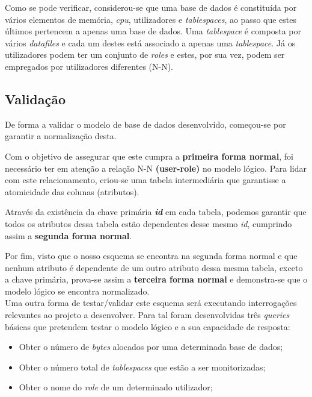 \documentclass[a4paper]{article}
\begin{document}
Como se pode verificar, considerou-se que uma base de dados é constituída por vários elementos de memória, \emph{cpu}, utilizadores e \emph{tablespaces}, ao passo que estes últimos pertencem a apenas uma base de dados. Uma \emph{tablespace} é composta por vários \emph{datafiles} e cada um destes está associado a apenas uma \emph{tablespace}. Já os utilizadores podem ter um conjunto de \emph{roles} e estes, por sua vez, podem ser empregados por utilizadores diferentes (N-N).


\subsection{Validação}
\hspace{3mm} 
De forma a validar o modelo de base de dados desenvolvido, começou-se por garantir a normalização desta. 

Com o objetivo de assegurar que este cumpra a \textbf{primeira forma normal}, foi necessário ter em atenção a relação N-N \textbf{(user-role)} no modelo lógico. Para lidar com este relacionamento, criou-se uma tabela intermediária que garantisse a atomicidade das colunas (atributos). 

Através da existência da chave primária \emph{\textbf{id}} em cada tabela, podemos garantir que todos os atributos dessa tabela estão dependentes desse mesmo \emph{id}, cumprindo assim a \textbf{segunda forma normal}. 

Por fim, visto que o nosso esquema se encontra na segunda forma normal e que nenhum atributo é dependente de um outro atributo dessa mesma tabela, exceto a chave primária, prova-se assim a \textbf{terceira forma normal} e demonstra-se que o modelo lógico se encontra normalizado.\\

Uma outra forma de testar/validar este esquema será executando interrogações relevantes ao projeto a desenvolver. Para tal foram desenvolvidas três \emph{queries} básicas que pretendem testar o modelo lógico e a sua capacidade de resposta:
\begin{itemize}
    \item Obter o número de \emph{bytes} alocados por uma determinada base de dados;
    \item Obter o número total de \emph{tablespaces} que estão a ser monitorizadas;
    \item Obter o nome do \emph{role} de um determinado utilizador;
\end{itemize}
\end{document}

